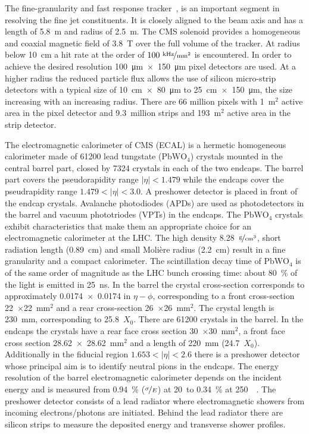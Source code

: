 The fine-granularity and fast response tracker~\cite{Karimaki:368412}, \cite{tracker_addendum} is an important segment in resolving the fine jet constituents. It is closely aligned to the beam axis and has a length of 5.8~m and radius of 2.5~m. The CMS solenoid provides a homogeneous and coaxial magnetic field of 3.8~T over the full volume of the tracker. At radius below 10~cm a hit rate at the order of $100~\nicefrac{\text{kHz}}{\text{mm}^2}$ is encountered. In order to achieve the desired resolution \SI{100}{\um}~$\times$~\SI{150}{\um} pixel detectors are used. At a higher radius the reduced particle flux allows the use of silicon micro-strip detectors with a typical size of 10~cm~$\times$~\SI{80}{\um} to 25~cm~$\times$~\SI{150}{\um}, the size increasing with an increasing radius. There are 66 million pixels with 1~$\text{m}^{2}$ active area in the pixel detector and 9.3~million strips and 193~${\text{m}}^2$ active area in the strip detector.

The electromagnetic calorimeter of CMS (ECAL) is a hermetic homogeneous calorimeter made of \num{61200} lead tungstate ($\text{PbWO}_{4}$) crystals mounted in the central barrel part, closed by \num{7324} crystals in each of the two endcaps. The barrel part covers the pseudorapidity range $\left|\eta\right|<1.479$ while the endcaps cover the pseudrapidity range $1.479<\left|\eta\right|<3.0$. A preshower detector is placed in front of the endcap crystals. Avalanche photodiodes (APDs) are used as photodetectors in the barrel and vacuum phototriodes (VPTs) in the endcaps. The $\text{PbWO}_{4}$ crystals exhibit characteristics that make them an appropriate choice for an electromagnetic calorimeter at the LHC. The high density 8.28~$\nicefrac{\text{g}}{\text{cm}^3}$, short radiation length (0.89~cm) and small Molière radius (2.2~cm) result in a fine granularity and a compact calorimeter. The scintillation decay time of $\text{PbWO}_{4}$ is of the same order of magnitude as the LHC bunch crossing time: about 80~\% of the light is emitted in 25~ns. In the barrel the crystal cross-section corresponds to approximately 0.0174~$\times$~0.0174 in $\eta-\phi$, corresponding to a front cross-section 22~$\times$22~$\text{mm}^2$ and a rear cross-section 26~$\times$26~$\text{mm}^2$. The crystal length is 230~mm, corresponding to 25.8~$X_{0}$. There are \num{61200} crystals in the barrel. In the endcaps the crystals have a rear face cross section 30~$\times$30~$\text{mm}^2$, a front face cross section 28.62~$\times$~28.62~$\text{mm}^2$ and a length of 220~mm (24.7~$X_{0}$). Additionally in the fiducial region $1.653<\left|\eta\right|<2.6$ there is a preshower detector whose principal aim is to identify neutral pions in the endcaps. The energy resolution of the barrel electromagnetic calorimeter depends on the incident energy and is measured from 0.94~\% ($\nicefrac{\sigma}{E}$) at 20~\GeV to 0.34~\% at 250~\GeV~\cite{Adzic:2007mi}. The preshower detector consists of a lead radiator where electromagnetic showers from incoming electrons/photons are initiated. Behind the lead radiator there are silicon strips to measure the deposited energy and transverse shower profiles.

